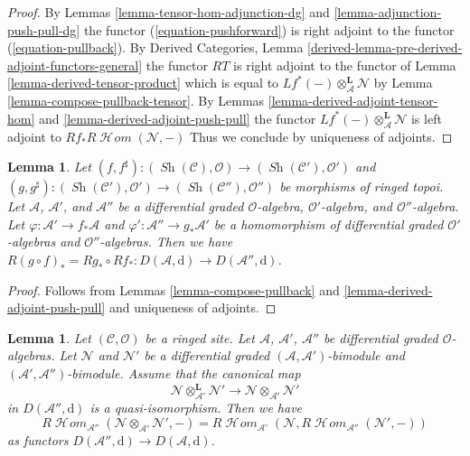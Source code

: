 \documentclass{stacks-project}
\theoremstyle{plain}
\newtheorem{lemma}[subsection]{Lemma}
\theoremstyle{definition}
\theoremstyle{remark}
\numberwithin{equation}{subsection}
\def\SheafHom{\mathop{\mathcal{H}\!\mathit{om}}\nolimits}
\def\Sh{\mathop{\mathit{Sh}}\nolimits}
\begin{document}
\begin{proof}
By Lemmas \ref{lemma-tensor-hom-adjunction-dg} and
\ref{lemma-adjunction-push-pull-dg} the functor
(\ref{equation-pushforward}) is right adjoint to
the functor (\ref{equation-pullback}). By Derived Categories, Lemma
\ref{derived-lemma-pre-derived-adjoint-functors-general}
the functor $RT$ is right adjoint to the functor
of Lemma \ref{lemma-derived-tensor-product} which is equal to
$Lf^*(-) \otimes_\mathcal{A}^\mathbf{L} \mathcal{N}$ by
Lemma \ref{lemma-compose-pullback-tensor}.
By Lemmas \ref{lemma-derived-adjoint-tensor-hom} and
\ref{lemma-derived-adjoint-push-pull} the functor
$Lf^*(-) \otimes_\mathcal{A}^\mathbf{L} \mathcal{N}$
is left adjoint to
$Rf_* R\SheafHom(\mathcal{N}, -)$
Thus we conclude by uniqueness of adjoints.
\end{proof}

\begin{lemma}
\label{lemma-compose-pushforward}
Let $(f, f^\sharp) : (\Sh(\mathcal{C}), \mathcal{O})
\to (\Sh(\mathcal{C}'), \mathcal{O}')$ and
$(g, g^\sharp) : (\Sh(\mathcal{C}'), \mathcal{O}')
\to (\Sh(\mathcal{C}''), \mathcal{O}'')$
be morphisms of ringed topoi. Let $\mathcal{A}$, $\mathcal{A}'$, and
$\mathcal{A}''$ be a differential graded $\mathcal{O}$-algebra,
$\mathcal{O}'$-algebra, and $\mathcal{O}''$-algebra. Let
$\varphi : \mathcal{A}' \to f_*\mathcal{A}$ and
$\varphi' : \mathcal{A}'' \to g_*\mathcal{A}'$
be a homomorphism of differential graded $\mathcal{O}'$-algebras
and $\mathcal{O}''$-algebras.
Then we have $R(g \circ f)_* = Rg_* \circ Rf_* :
D(\mathcal{A}, \text{d}) \to D(\mathcal{A}'', \text{d})$.
\end{lemma}

\begin{proof}
Follows from Lemmas \ref{lemma-compose-pullback} and
\ref{lemma-derived-adjoint-push-pull}
and uniqueness of adjoints.
\end{proof}

\begin{lemma}
\label{lemma-compose-hom}
Let $(\mathcal{C}, \mathcal{O})$ be a ringed site. Let
$\mathcal{A}$, $\mathcal{A}'$, $\mathcal{A}''$ be differential graded
$\mathcal{O}$-algebras. Let $\mathcal{N}$ and $\mathcal{N}'$ be a
differential graded $(\mathcal{A}, \mathcal{A}')$-bimodule
and $(\mathcal{A}', \mathcal{A}'')$-bimodule. Assume
that the canonical map
$$
\mathcal{N} \otimes_{\mathcal{A}'}^\mathbf{L} \mathcal{N}'
\longrightarrow
\mathcal{N} \otimes_{\mathcal{A}'} \mathcal{N}'
$$
in $D(\mathcal{A}'', \text{d})$ is a quasi-isomorphism.
Then we have
$$
R\SheafHom_{\mathcal{A}''}
(\mathcal{N} \otimes_{\mathcal{A}'} \mathcal{N}', -)
=
R\SheafHom_{\mathcal{A}'}(\mathcal{N},
R\SheafHom_{\mathcal{A}''}(\mathcal{N}', -))
$$
as functors $D(\mathcal{A}'', \text{d}) \to D(\mathcal{A}, \text{d})$.
\end{lemma}
\end{document}
